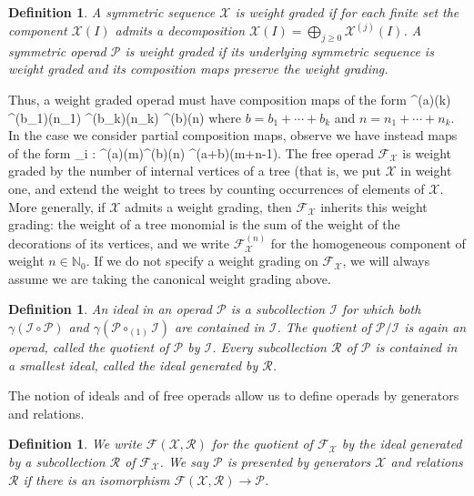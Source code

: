 \documentclass[fleqn, a4paper, twoside]{article}
\makeatletter
\newcommand{\0}{\langle 0\rangle}
\newcommand{\XX}{\mathcal{X}}
\newcommand{\RR}{\mathcal{R}}
\newcommand{\FF}{\mathcal{F}}
\let\[\@undefined
\DeclareRobustCommand{\[}{\begin{equation}}%
\let\]\@undefined
\DeclareRobustCommand{\]}{\end{equation}}%
\theoremstyle{mytheorem}
\theoremstyle{introthm}
\theoremstyle{mydefinition}
\newtheorem{definition}[theorem]{Definition}
\theoremstyle{mydefinition2}
\theoremstyle{plain} %
\newcommand{\?}{\,?\,}
\newcommand{\NN}{\mathbb N}
\newcommand{\PP}{{\mathcal{P}}}
\theoremstyle{mytheorem}
\theoremstyle{plain} %
\makeatother
\begin{document}
\begin{definition}
A symmetric sequence $\XX$ is weight graded if for
each finite set the component $\XX(I)$ admits a 
decomposition $\XX(I) = \bigoplus_{j\geqslant 0}
\XX^{(j)}(I)$. A symmetric operad $\PP$ is weight
graded if its underlying symmetric sequence
is weight graded and its composition maps
preserve the weight grading.
\end{definition}

Thus, a weight graded operad must have composition maps 
of the form
\[ \PP^{(a)}(k) \otimes 
	\PP^{(b_1)}(n_1) \otimes \cdots \otimes \PP^{(b_k)}(n_k)
	 	\longrightarrow \PP^{(b)}(n) \]
where $b=b_1+\cdots+b_k$ and $n = n_1+\cdots+n_k$. In the
case we consider partial composition maps, observe we have
instead maps of the form
\[\circ_i :  \PP^{(a)}(m)\otimes  \PP^{(b)}(n)
	\longrightarrow  \PP^{(a+b)}(m+n-1). \] 
The free operad $\FF_\XX$ is weight graded by the number
of internal vertices of a tree (that is, we put $\XX$ in
weight one, and extend the weight to trees by counting 
occurrences of elements of $\XX$. More generally, if
$\XX$ admits a weight grading, then $\FF_\XX$ inherits
this weight grading: the weight of a tree monomial is the
sum of the weight of the decorations of its vertices,
 and we write $\FF_\XX^{(n)}$ for the
homogeneous component of weight $n\in\NN_0$. If we do
not specify a weight grading on $\FF_\XX$, we will 
always assume we are taking the canonical weight grading above.


\begin{definition} An ideal in an operad $\PP$
is a subcollection $\mathcal{I}$ for which
both $\gamma(\mathcal{I}\circ \PP)$ and
$\gamma(\PP\circ_{(1)} \mathcal{I})$ are contained in
$\mathcal{I}$.
The quotient of $\PP/\mathcal{I}$ is again an
operad, called the quotient of $\PP$ 
by $\mathcal{I}$. Every subcollection $\RR$
of $\PP$ is contained in a smallest
ideal, called the \emph{ideal generated by $\RR$}.
\end{definition}

The notion of ideals and of free operads allow us
to define operads by generators and relations.

\begin{definition}
We write $\FF(\XX,\RR)$ for the quotient of 
$\FF_\XX$
by the ideal generated by a subcollection $\RR$
of $\FF_\XX$. 
 We say $\PP$ is presented by generators
$\XX$ and relations $\RR$ if there is an
isomorphism $\FF(\XX,\RR) \longrightarrow
\PP$.
\end{definition}
\end{document}
